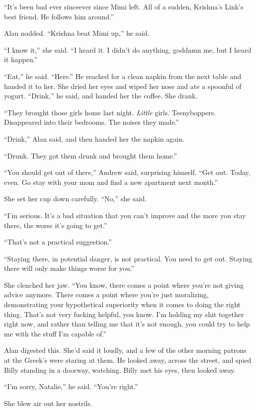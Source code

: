 ``It's been bad ever since\dash{}ever since Mimi left.  All of a sudden,
Krishna's Link's best friend.  He follows him around.''

Alan nodded.  ``Krishna beat Mimi up,'' he said. 

``I know it,'' she said.  ``I heard it.  I didn't do anything, goddamn
me, but I heard it happen.''

``Eat,'' he said.  ``Here.'' He reached for a clean napkin from the
next table and handed it to her.  She dried her eyes and wiped her
nose and ate a spoonful of yogurt.  ``Drink,'' he said, and handed her
the coffee.  She drank.

``They brought those girls home last night.  \textit{Little} girls. 
Teenyboppers.  Disappeared into their bedrooms.  The noises they
made.''

``Drink,'' Alan said, and then handed her the napkin again.

``Drunk.  They got them drunk and brought them home.''

``You should get out of there,'' Andrew said, surprising himself. 
``Get out.  Today, even.  Go stay with your mom and find a new
apartment next month.''

She set her cup down carefully.  ``No,'' she said.

``I'm serious.  It's a bad situation that you can't improve and the
more you stay there, the worse it's going to get.''

``That's not a practical suggestion.''

``Staying there, in potential danger, is not practical.  You need to
get out.  Staying there will only make things worse for you.''

She clenched her jaw.  ``You know, there comes a point where you're
not giving advice anymore.  There comes a point where you're just
moralizing, demonstrating your hypothetical superiority when it comes
to doing the right thing.  That's not very fucking helpful, you know. 
I'm holding my shit together right now, and rather than telling me
that it's not enough, you could try to help me with the stuff I'm
capable of.''

Alan digested this.  She'd said it loudly, and a few of the other
morning patrons at the Greek's were staring at them.  He looked away,
across the street, and spied Billy standing in a doorway, watching. 
Billy met his eyes, then looked away.

``I'm sorry, Natalie,'' he said.  ``You're right.''

She blew air out her nostrils. 

